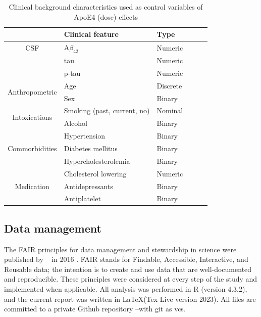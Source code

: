 \documentclass{amsart}
\begin{document}
\begin{table}[htb]
\caption{Clinical background characteristics used as control variables of ApoE4 (dose) effects}
\label{tab:clin}
\begin{tabular}{clllll} \toprule
                                & \textbf{Clinical feature}   & \textbf{Type} \\ \midrule
CSF                             & A$\beta_{42}$                 & Numeric       \\
                                & tau                         & Numeric       \\
                                & p-tau                       & Numeric       \\
\multirow{2}{*}{Anthropometric} & Age                         & Discrete      \\
                                & Sex                         & Binary        \\
\multirow{2}{*}{Intoxications}  & Smoking (past, current, no) & Nominal       \\
                                & Alcohol                     & Binary        \\
\multirow{3}{*}{Commorbidities} & Hypertension                & Binary        \\
                                & Diabetes mellitus           & Binary        \\
                                & Hypercholesterolemia        & Binary        \\
\multirow{3}{*}{Medication}     & Cholesterol lowering        & Numeric       \\
                                & Antidepressants             & Binary        \\
                                & Antiplatelet                & Binary        \\ \bottomrule
\end{tabular}
\end{table}

\subsection{Data management}\label{datamanagement}
The FAIR principles for data management and stewardship in science were published by  ~\citeauthor{Wilkinson2016TheStewardship} in 2016 \cite{Wilkinson2016TheStewardship}. FAIR stands for Findable, Accessible, Interactive, and Reusable data; the intention is to create and use data that are well-documented and reproducible. These principles were considered at every step of the study and implemented when applicable. All analysis was performed in R (version 4.3.2), and the current report was written in \LaTeX (Tex Live version 2023). All files are committed to a private Github repository --with git as \acrfull{vcs}.
\end{document}
